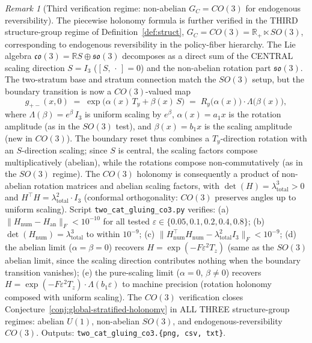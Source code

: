 \documentclass[11pt,a4paper]{article}
\theoremstyle{plain}
\theoremstyle{definition}
\theoremstyle{remark}
\newtheorem{remark}[theorem]{Remark}
\begin{document}
\begin{remark}[Third verification regime: non-abelian $G_C = CO(3)$ for
endogenous reversibility]
\label{rem:2cat-gluing-co3}
The piecewise holonomy formula is further verified in the THIRD
structure-group regime of Definition~\ref{def:struct}, $G_C = CO(3)
= \mathbb{R}_+ \ltimes SO(3)$, corresponding to endogenous reversibility
in the policy-fiber hierarchy. The Lie algebra $\mathfrak{co}(3) =
\mathbb{R} S \oplus \mathfrak{so}(3)$ decomposes as a direct sum of the
CENTRAL scaling direction $S = I_3$ ($[S, \,\cdot\,] = 0$) and the
non-abelian rotation part $\mathfrak{so}(3)$. The two-stratum base and
stratum connection match the $SO(3)$ setup, but the boundary transition
is now a $CO(3)$-valued map
\begin{equation}\label{eq:co3-transition}
  g_{+-}(x, 0) \;=\; \exp\bigl(\alpha(x)\,T_y + \beta(x)\,S\bigr)
  \;=\; R_y\bigl(\alpha(x)\bigr) \cdot \Lambda\bigl(\beta(x)\bigr),
\end{equation}
where $\Lambda(\beta) = e^{\beta}\,I_3$ is uniform scaling by $e^{\beta}$,
$\alpha(x) = a_1 x$ is the rotation amplitude (as in the $SO(3)$ test),
and $\beta(x) = b_1 x$ is the scaling amplitude (new in $CO(3)$). The
boundary reset thus combines a $T_y$-direction rotation with an $S$-direction
scaling; since $S$ is central, the scaling factors compose multiplicatively
(abelian), while the rotations compose non-commutatively (as in the $SO(3)$
regime). The $CO(3)$ holonomy is consequently a product of non-abelian
rotation matrices and abelian scaling factors, with $\det(H) =
\lambda_{\mathrm{total}}^3 > 0$ and $H^\top H = \lambda_{\mathrm{total}}^2
\cdot I_3$ (conformal orthogonality: $CO(3)$ preserves angles up to uniform
scaling). Script \texttt{two\_cat\_gluing\_co3.py} verifies: (a)
$\|H_{\mathrm{num}} - H_{\mathrm{an}}\|_F < 10^{-10}$ for all tested
$\varepsilon \in \{0.05, 0.1, 0.2, 0.4, 0.8\}$; (b)
$\det(H_{\mathrm{num}}) = \lambda_{\mathrm{total}}^3$ to within $10^{-9}$;
(c) $\|H_{\mathrm{num}}^\top H_{\mathrm{num}} -
\lambda_{\mathrm{total}}^2 I_3\|_F < 10^{-9}$; (d) the abelian limit
($\alpha = \beta = 0$) recovers $H = \exp(-F\varepsilon^2 T_z)$ (same
as the $SO(3)$ abelian limit, since the scaling direction contributes
nothing when the boundary transition vanishes); (e) the pure-scaling
limit ($\alpha = 0$, $\beta \neq 0$) recovers $H =
\exp(-F\varepsilon^2 T_z) \cdot \Lambda(b_1 \varepsilon)$ to machine
precision (rotation holonomy composed with uniform scaling). The $CO(3)$
verification closes Conjecture~\ref{conj:global-stratified-holonomy} in
ALL THREE structure-group regimes: abelian $U(1)$, non-abelian $SO(3)$,
and endogenous-reversibility $CO(3)$. Outputs:
\texttt{two\_cat\_gluing\_co3.\{png, csv, txt\}}.
\end{remark}
\end{document}
